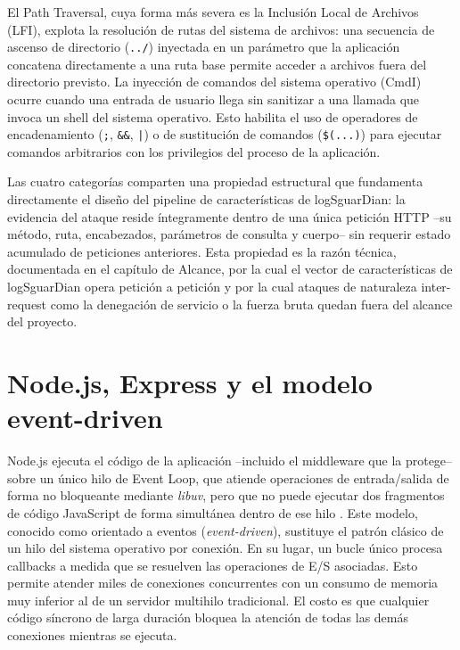 El Path Traversal, cuya forma más severa es la Inclusión Local de Archivos (LFI), explota la resolución de rutas del sistema de archivos: una secuencia de ascenso de directorio (\texttt{../}) inyectada en un parámetro que la aplicación concatena directamente a una ruta base permite acceder a archivos fuera del directorio previsto. La inyección de comandos del sistema operativo (CmdI) ocurre cuando una entrada de usuario llega sin sanitizar a una llamada que invoca un shell del sistema operativo. Esto habilita el uso de operadores de encadenamiento (\texttt{;}, \texttt{\&\&}, \texttt{|}) o de sustitución de comandos (\texttt{\$(...)}) para ejecutar comandos arbitrarios con los privilegios del proceso de la aplicación.

Las cuatro categorías comparten una propiedad estructural que fundamenta directamente el diseño del pipeline de características de logSguarDian: la evidencia del ataque reside íntegramente dentro de una única petición HTTP --su método, ruta, encabezados, parámetros de consulta y cuerpo-- sin requerir estado acumulado de peticiones anteriores. Esta propiedad es la razón técnica, documentada en el capítulo de Alcance, por la cual el vector de características de logSguarDian opera petición a petición y por la cual ataques de naturaleza inter-request como la denegación de servicio o la fuerza bruta quedan fuera del alcance del proyecto.

\section{Node.js, Express y el modelo event-driven}

Node.js ejecuta el código de la aplicación --incluido el middleware que la protege-- sobre un único hilo de Event Loop, que atiende operaciones de entrada/salida de forma no bloqueante mediante \textit{libuv}, pero que no puede ejecutar dos fragmentos de código JavaScript de forma simultánea dentro de ese hilo \parencite{nodejs-event-loop}. Este modelo, conocido como orientado a eventos (\textit{event-driven}), sustituye el patrón clásico de un hilo del sistema operativo por conexión. En su lugar, un bucle único procesa callbacks a medida que se resuelven las operaciones de E/S asociadas. Esto permite atender miles de conexiones concurrentes con un consumo de memoria muy inferior al de un servidor multihilo tradicional. El costo es que cualquier código síncrono de larga duración bloquea la atención de todas las demás conexiones mientras se ejecuta.


